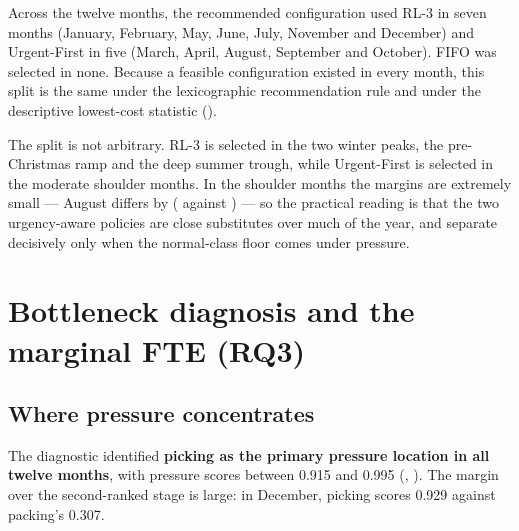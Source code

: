 Across the twelve months, the recommended configuration used RL-3 in seven months (January,
February, May, June, July, November and December) and Urgent-First in five (March, April,
August, September and October). FIFO was selected in none. Because a feasible configuration
existed in every month, this split is the same under the lexicographic recommendation rule and
under the descriptive lowest-cost statistic ().

The split is not arbitrary. RL-3 is selected in the two winter peaks, the pre-Christmas ramp
and the deep summer trough, while Urgent-First is selected in the moderate shoulder months. In
the shoulder months the margins are extremely small --- August differs by 
( against ) --- so the practical reading is that the two urgency-aware
policies are close substitutes over much of the year, and separate decisively only when the
normal-class floor comes under pressure.

\section{Bottleneck diagnosis and the marginal FTE (RQ3)}
\label{sec:res-bottleneck}

\subsection{Where pressure concentrates}

The diagnostic identified \textbf{picking as the primary pressure location in all twelve
months}, with pressure scores between \num{0.915} and \num{0.995}
(, ). The margin over the second-ranked stage is large:
in December, picking scores \num{0.929} against packing's \num{0.307}.

